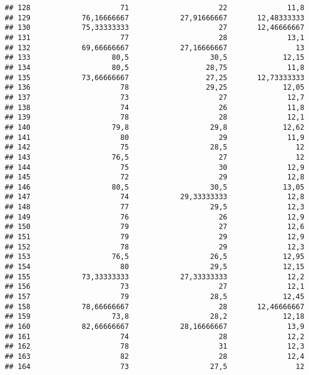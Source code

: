 \documentclass[
]{article}
\begin{document}
\begin{verbatim}
## 128                     71                     22              11,8
## 129            76,16666667            27,91666667       12,48333333
## 130            75,33333333                     27       12,46666667
## 131                     77                     28              13,1
## 132            69,66666667            27,16666667                13
## 133                   80,5                   30,5             12,15
## 134                   80,5                  28,75              11,8
## 135            73,66666667                  27,25       12,73333333
## 136                     78                  29,25             12,05
## 137                     73                     27              12,7
## 138                     74                     26              11,8
## 139                     78                     28              12,1
## 140                   79,8                   29,8             12,62
## 141                     80                     29              11,9
## 142                     75                   28,5                12
## 143                   76,5                     27                12
## 144                     75                     30              12,9
## 145                     72                     29              12,8
## 146                   80,5                   30,5             13,05
## 147                     74            29,33333333              12,8
## 148                     77                   29,5              12,3
## 149                     76                     26              12,9
## 150                     79                     27              12,6
## 151                     79                     29              12,9
## 152                     78                     29              12,3
## 153                   76,5                   26,5             12,95
## 154                     80                   29,5             12,15
## 155            73,33333333            27,33333333              12,2
## 156                     73                     27              12,1
## 157                     79                   28,5             12,45
## 158            78,66666667                     28       12,46666667
## 159                   73,8                   28,2             12,18
## 160            82,66666667            28,16666667              13,9
## 161                     74                     28              12,2
## 162                     78                     31              12,3
## 163                     82                     28              12,4
## 164                     73                   27,5                12

\end{verbatim}
\end{document}
